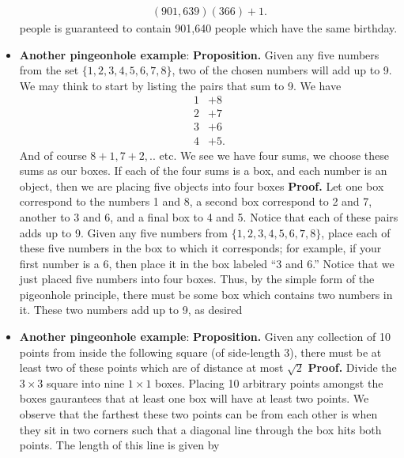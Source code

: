 \documentclass{report}
\begin{document}
\begin{itemize}
            \begin{align*}
                (901, 639)(366) + 1
            .\end{align*}
            \bigbreak \noindent 
            people is guaranteed to contain 901,640 people which have the same birthday.
        \item \textbf{Another pingeonhole example}:
            \bigbreak \noindent 
            \textbf{Proposition.} Given any five numbers from the set $\{1, 2, 3, 4, 5, 6, 7, 8\}$, two of the chosen numbers will add up to 9.
            \bigbreak \noindent 
            We may think to start by listing the pairs that sum to 9. We have
            \begin{align*}
                1 &+ 8 \\ 
                2 &+ 7 \\
                3 &+ 6 \\
                4 &+ 5 
            .\end{align*}
            And of course $8+1,7+2,..$ etc. We see we have four sums, we choose these sums as our boxes. If each of the four sums is a box, and each number is an object, then we are placing five objects into four boxes 
            \bigbreak \noindent 
            \textbf{Proof.} Let one box correspond to the numbers 1 and 8, a second box correspond to 2 and 7, another to 3 and 6, and a final box to 4 and 5. Notice that each of these pairs adds up to 9.
            \bigbreak \noindent 
            Given any five numbers from $\{1, 2, 3, 4, 5, 6, 7, 8\}$, place each of these five numbers in the box to which it corresponds; for example, if your first number is a 6, then place it in the box labeled “3 and 6.” Notice that we just placed five numbers into four boxes. Thus, by the simple form of the pigeonhole principle, there must be some box which contains two numbers in it. These two numbers add up to 9, as desired
        \item \textbf{Another pingeonhole example}:
            \bigbreak \noindent 
            \textbf{Proposition.} Given any collection of 10 points from inside the following square (of side-length 3), there must be at least two of these points which are of distance at most $\sqrt{2}$
            \bigbreak \noindent 
            \bigbreak \noindent 
            \textbf{Proof.} Divide the $3\times 3$ square into nine $1\times 1$ boxes. Placing 10 arbitrary points amongst the boxes gaurantees that at least one box will have at least two points. We observe that the farthest these two points can be from each other is when they sit in two corners such that a diagonal line through the box hits both points. The length of this line is given by

\end{itemize}
\end{document}
